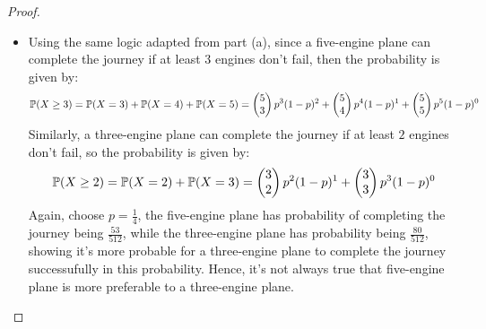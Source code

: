 \documentclass{article}
\begin{document}
\begin{proof}
\begin{itemize}
        \item[(b)] Using the same logic adapted from part (a), since a five-engine plane can complete the journey if at least $3$ engines don't fail, then the probability is given by:
        \begin{align}
            \mathbb{P}(X\geq 3) = \mathbb{P}(X=3)+\mathbb{P}(X=4)+\mathbb{P}(X=5) = \begin{pmatrix}5\\3\end{pmatrix}p^3(1-p)^2 + \begin{pmatrix}5\\4\end{pmatrix}p^4(1-p)^1 + \begin{pmatrix}5\\5\end{pmatrix}p^5(1-p)^0
        \end{align}
        Similarly, a three-engine plane can complete the journey if at least $2$ engines don't fail, so the probability is given by:
        \begin{align}
            \mathbb{P}(X\geq 2)=\mathbb{P}(X=2)+\mathbb{P}(X=3)= \begin{pmatrix}3\\2\end{pmatrix}p^2(1-p)^1 + \begin{pmatrix}3\\3\end{pmatrix}p^3(1-p)^0
        \end{align}
        Again, choose $p=\frac{1}{4}$, the five-engine plane has probability of completing the journey being $\frac{53}{512}$, while the three-engine plane has probability being $\frac{80}{512}$, showing it's more probable for a three-engine plane to complete the journey successufully in this probability. Hence, it's not always true that five-engine plane is more preferable to a three-engine plane.
    \end{itemize}
\end{proof}

\newpage
\end{document}
